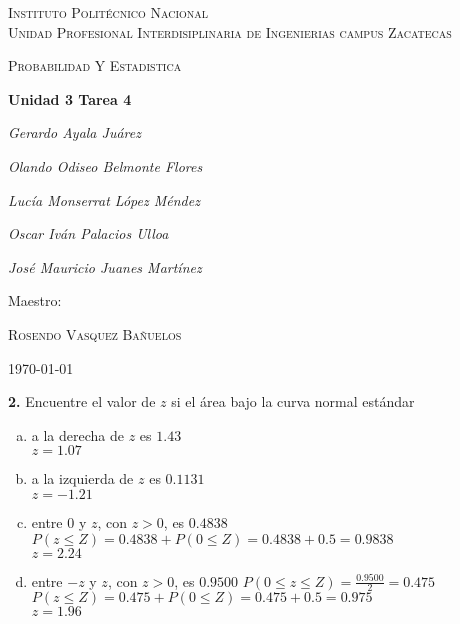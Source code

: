 \documentclass[12pt, letterpaper]{article}
\begin{document}
    \begin{titlepage}
        \centering
        {\scshape\LARGE Instituto Politécnico Nacional\\ Unidad Profesional Interdisiplinaria de Ingenierias campus Zacatecas\par}
        \vspace{1cm}
        {\scshape\Large Probabilidad Y Estadistica\par}
        \vspace{1.5cm}
        {\huge\bfseries Unidad 3 Tarea 4\par}
        \vspace{2cm}
        {\Large\itshape Gerardo Ayala Juárez\par}
        {\Large\itshape Olando Odiseo Belmonte Flores\par}
        {\Large\itshape Lucía Monserrat López Méndez\par}
        {\Large\itshape Oscar Iván Palacios Ulloa\par}
        {\Large\itshape José Mauricio Juanes Martínez\par}
        \vfill
        Maestro:\par
        \textsc{
        Rosendo Vasquez Bañuelos}
        \vfill
        {\large \today \par}
    \end{titlepage}

    \textbf{2. }Encuentre el valor de $z$ si el área bajo la curva normal estándar
        \begin{enumerate}[a)]
            \item a la derecha de $z$ es $1.43$\\
                $z=1.07$
            \item a la izquierda de $z$ es $0.1131$\\
                $z=-1.21$
            \item entre $0$ y $z$, con $z>0$, es $0.4838$\\
                $P(z\leq Z)=0.4838+P(0\leq Z)=0.4838+0.5=0.9838$\\
                $z=2.24$
            \item entre $-z$ y $z$, con $z>0$, es $0.9500$\vskip0.5cm
                $P(0\leq z\leq Z)=\displaystyle\frac{0.9500}{2}=0.475$\\
                $P(z\leq Z)=0.475+P(0\leq Z)=0.475+0.5=0.975$\\
                $z=1.96$
        \end{enumerate} \vskip1cm
\end{document}
